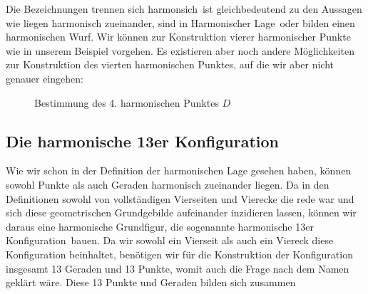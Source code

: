 \documentclass[12pt,a4paper]{article}
\begin{document}
Die Bezeichnungen \glqq trennen sich harmonsich\grqq ~ist gleichbedeutend zu den Aussagen wie \glqq liegen harmonisch zueinander\grqq , \glqq sind in Harmonischer Lage\grqq ~oder \glqq bilden einen harmonischen Wurf\grqq .
\newline
\newline
Wir können zur Konstruktion vierer harmonischer Punkte wie in unserem Beispiel vorgehen. Es existieren aber noch andere Möglichkeiten zur Konstruktion des vierten harmonischen Punktes, auf die wir aber nicht genauer eingehen:

\begin{figure} [htbp]
 \hfill
{}
\caption{Bestimmung des 4. harmonischen Punktes $D$}
\end{figure} 

\newpage
\subsection{Die harmonische 13er Konfiguration}
\label{subsec:harmonischeKonfiguration}

Wie wir schon in der Definition der harmonischen Lage gesehen haben, können sowohl Punkte als auch Geraden harmonisch zueinander liegen. Da in den Definitionen sowohl von vollständigen Vierseiten und Vierecke die rede war und sich diese geometrischen Grundgebilde aufeinander inzidieren lassen, können wir daraus eine harmonische Grundfigur, die sogenannte \glqq harmonische 13er Konfiguration\grqq ~bauen. Da wir sowohl ein Vierseit als auch ein Viereck diese Konfiguration beinhaltet, benötigen wir für die Konstruktion der Konfiguration insgesamt 13 Geraden und 13 Punkte, womit auch die Frage nach dem Namen geklärt wäre. Diese 13 Punkte und Geraden bilden sich zusammen
\end{document}
